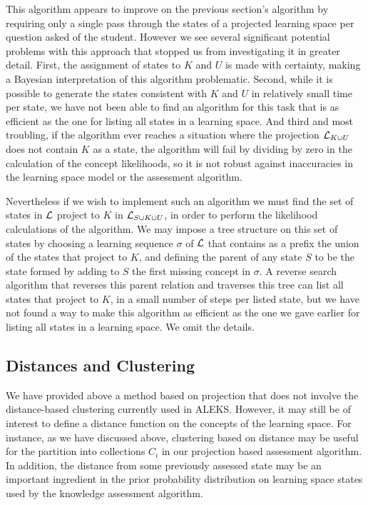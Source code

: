 \documentclass[11pt]{llncs}
\begin{document}
{This algorithm appears to improve on the previous section's algorithm by requiring only a single
pass through the states of a projected learning space per question asked of the student. However we see several significant potential problems with this approach that stopped us from investigating it in greater detail. First, the assignment of states to $K$ and $U$ is made with certainty, making a Bayesian interpretation of this algorithm problematic. Second, while it is possible to generate the states consistent with $K$ and $U$ in relatively small time per state, we have not been able to find an algorithm for this task that is as efficient as the one for listing all states in a learning space. And third and most troubling, if the algorithm ever reaches a situation where the projection ${\cal L}_{K\cup U}$ does not contain $K$ as a state, the algorithm will fail by dividing by zero in the calculation of the concept likelihoods, so it is not robust against inaccuracies in the learning space model or the assessment algorithm.

Nevertheless if we wish to implement such an algorithm we must find the set of states in $\cal L$ project to $K$ in ${\cal L}_{S\cup K\cup U}$, in order to perform the likelihood calculations of the algorithm.
We may impose a tree structure on this set of states by choosing a learning sequence $\sigma$ of $\cal L$ that contains as a prefix the union of the states that project to $K$, and defining the parent of any state $S$ to be the state formed by adding to $S$ the first missing concept in $\sigma$. A reverse search algorithm that reverses this parent relation and traverses this tree can list all states that project to $K$, in a small number of steps per listed state, but we have not found a way to make this algorithm as efficient as the one we gave earlier for listing all states in a learning space. We omit the details.

\subsection{Distances and Clustering}

We have provided above a method based on projection that does not involve the distance-based clustering currently used in ALEKS. However, it may still be of interest to define a distance function on the concepts of the learning space. For instance, as we have discussed above, clustering based on distance may be useful for the partition into collections $C_i$ in our projection based assessment algorithm. In addition, the distance from some previously assessed state may be an important ingredient in the prior probability distribution on learning space states used by the knowledge assessment algorithm.

}
\end{document}
